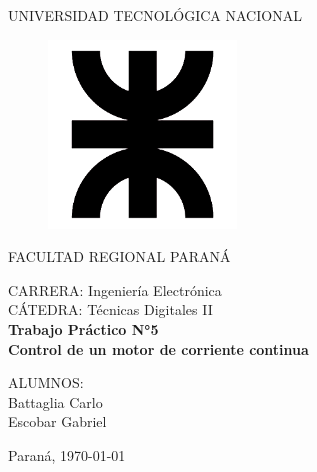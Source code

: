 \documentclass[a4paper, 12pt]{article}
\begin{document}
\begin{titlepage}
	\begin{center}
		{\large{UNIVERSIDAD TECNOLÓGICA NACIONAL}}
	\end{center}
	\vspace{15pt}
	\begin{figure}[!ht]
		\centering
		\begin{center}
			\includegraphics[width=5cm]{utn.png}
		\end{center}
	\end{figure}
	\vspace{5pt}
	\begin{center}
		{\large{FACULTAD REGIONAL PARANÁ}}
		\vspace{5pt}
		\begin{center}
			\vspace{15pt}
			\normalsize{CARRERA: Ingeniería Electrónica\\
						CÁTEDRA: Técnicas Digitales II\\}
			\vspace{50pt}
			\huge\bfseries{Trabajo Práctico N°5\\
						Control de un motor de corriente continua\\}
			\vspace{50pt}
		\end{center}
		
		\begin{flushleft}
			\begin{center}
				ALUMNOS:\\
				Battaglia Carlo\\
				Escobar Gabriel\\
			\end{center}
		\end{flushleft}
		
		\begin{center}
			\vspace{\fill}
			\normalsize{Paraná,}
			\today
		\end{center}
	\end{center}
\end{titlepage}
\end{document}
